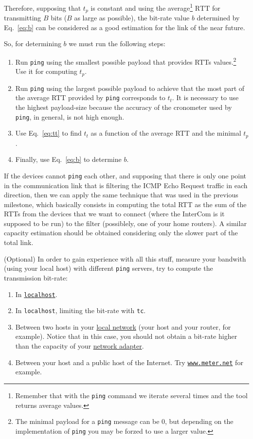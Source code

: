 Therefore, supposing that $t_p$ is constant and using the
average\footnote{Remember that with the \texttt{ping} command we
iterate several times and the tool returns average values.}
$\text{RTT}$ for transmitting $B$ bits ($B$ as
large as possible), the bit-rate value $b$ determined by
Eq.~\ref{eq:b} can be considered as a good estimation for the link of
the near future.

So, for determining $b$ we must run the following steps:
\begin{enumerate}
\item Run \texttt{ping} using the smallest possible payload that
  provides RTTs values.\footnote{The minimal payload for a
    \texttt{ping} message can be 0, but depending on the
    implementation of \texttt{ping} you may be forzed to use a larger
    value.} Use it for computing $t_p$.
  
\item Run \texttt{ping} using the largest possible payload to achieve
  that the most part of the average RTT provided by \texttt{ping}
  corresponds to $t_t$. It is necessary to use the highest
  payload-size because the accuracy of the cronometer used by
  \texttt{ping}, in general, is not high enough.
  
\item Use Eq.~\ref{eq:tt} to find $t_t$ as a function of the average
  RTT and the minimal $t_p$.
  
\item Finally, use Eq.~\ref{eq:b} to determine $b$.
\end{enumerate}

If the devices cannot \texttt{ping} each other, and supposing that
there is only one point in the communication link that is filtering
the ICMP Echo Request traffic in each direction, then we can apply the
same technique that was used in the previous milestone, which
basically consists in computing the total RTT as the sum of the RTTs
from the devices that we want to connect (where the InterCom is it
supposed to be run) to the filter (possiblely, one of your home
routers). A similar capacity estimation should be obtained considering
only the slower part of the total link.

(Optional) In order to gain experience with all this stuff, measure
your bandwith (using your local host) with different \texttt{ping}
servers, try to compute the transmission bit-rate:
\begin{enumerate}
\item In \href{https://en.wikipedia.org/wiki/Localhost}{\texttt{localhost}}.
\item In \texttt{localhost}, limiting the bit-rate with \texttt{tc}.
\item Between two hosts in your
  \href{https://en.wikipedia.org/wiki/Local_area_network}{local
    network} (your host and your router, for example). Notice that in
  this case, you should not obtain a bit-rate higher than the capacity
  of your
  \href{https://en.wikipedia.org/wiki/Network_interface_controller}{network
    adapter}.
\item Between your host and a public host of the Internet. Try
  \href{https://www.meter.net/}{\texttt{www.meter.net}} for example.
\end{enumerate}

